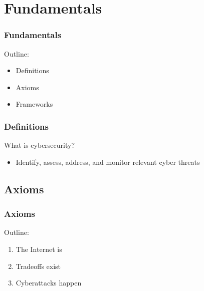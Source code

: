 \documentclass[blue]{beamer}
\begin{document}
\section{Fundamentals}



\begin{frame}
\frametitle{Fundamentals}

\begin{block}{Outline:}

\begin{itemize}
  \item Definitions
  \item Axioms
  \item Frameworks
\end{itemize}
\end{block}

\end{frame}



\begin{frame}
\frametitle{Definitions}

What is cybersecurity?

\begin{itemize}
  \item Identify, assess, address, and monitor relevant cyber threats
\end{itemize}

\end{frame}



\subsection{Axioms}

\begin{frame}
\frametitle{Axioms}

\begin{block}{Outline:}
\begin{enumerate}
  \item The Internet is
  \item Tradeoffs exist
  \item Cyberattacks happen
\end{enumerate}
\end{block}

\end{frame}
\end{document}
